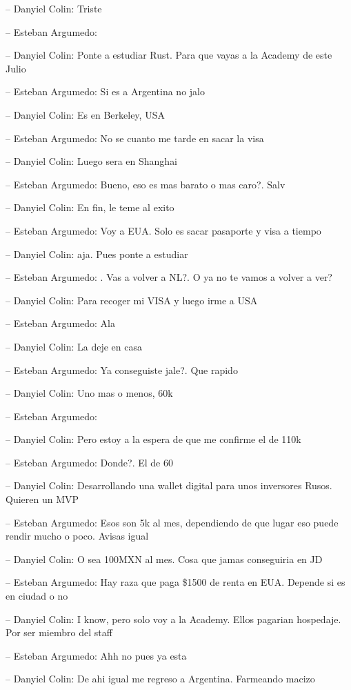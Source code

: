 -- Danyiel Colin: Triste

-- Esteban Argumedo:

-- Danyiel Colin: Ponte a estudiar Rust. Para que vayas a la Academy de
este Julio

-- Esteban Argumedo: Si es a Argentina no jalo

-- Danyiel Colin: Es en Berkeley, USA

-- Esteban Argumedo: No se cuanto me tarde en sacar la visa

-- Danyiel Colin: Luego sera en Shanghai

-- Esteban Argumedo: Bueno, eso es mas barato o mas caro?. Salv

-- Danyiel Colin: En fin, le teme al exito

-- Esteban Argumedo: Voy a EUA. Solo es sacar pasaporte y visa a tiempo

-- Danyiel Colin: aja. Pues ponte a estudiar

-- Esteban Argumedo: . Vas a volver a NL?. O ya no te vamos a volver a
ver?

-- Danyiel Colin: Para recoger mi VISA y luego irme a USA

-- Esteban Argumedo: Ala

-- Danyiel Colin: La deje en casa

-- Esteban Argumedo: Ya conseguiste jale?. Que rapido

-- Danyiel Colin: Uno mas o menos, 60k

-- Esteban Argumedo:

-- Danyiel Colin: Pero estoy a la espera de que me confirme el de 110k

-- Esteban Argumedo: Donde?. El de 60

-- Danyiel Colin: Desarrollando una wallet digital para unos inversores
Rusos. Quieren un MVP

-- Esteban Argumedo: Esos son 5k al mes, dependiendo de que lugar eso
puede rendir mucho o poco. Avisas igual

-- Danyiel Colin: O sea 100MXN al mes. Cosa que jamas conseguiria en JD

-- Esteban Argumedo: Hay raza que paga \$1500 de renta en EUA. Depende
si es en ciudad o no

-- Danyiel Colin: I know, pero solo voy a la Academy. Ellos pagarian
hospedaje. Por ser miembro del staff

-- Esteban Argumedo: Ahh no pues ya esta

-- Danyiel Colin: De ahi igual me regreso a Argentina. Farmeando macizo

